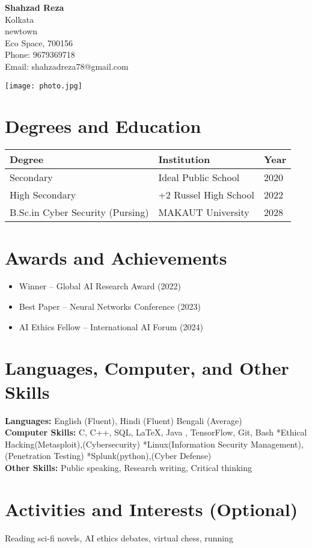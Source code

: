 \documentclass[12pt]{article}
\begin{document}
\begin{minipage}{0.7\textwidth}
    \Huge \textbf{Shahzad Reza} \\[6pt]
    \normalsize
    Kolkata \\
    newtown \\
    Eco Space, 700156 \\
    Phone: 9679369718 \\
    Email: shahzadreza78@gmail.com
\end{minipage}
\hfill
\begin{minipage}{0.25\textwidth}
 \texttt{[image: photo.jpg]}
\end{minipage}

\vspace{1em}

\section*{Degrees and Education}
\begin{tabularx}{\textwidth}{|X|X|X|}
\hline
\textbf{Degree} & \textbf{Institution} & \textbf{Year} \\
\hline
Secondary & Ideal Public School & 2020 \\
\hline
High Secondary & +2 Russel High School & 2022 \\
\hline
B.Sc.in Cyber Security (Pursing) & MAKAUT University & 2028 \\
\hline
\end{tabularx}

\section*{Awards and Achievements}
\begin{itemize}
    \item Winner – Global AI Research Award (2022)
    \item Best Paper – Neural Networks Conference (2023)
    \item AI Ethics Fellow – International AI Forum (2024)
\end{itemize}


\section*{Languages, Computer, and Other Skills}
\textbf{Languages:} English (Fluent), Hindi (Fluent) Bengali (Average) \\
\textbf{Computer Skills:} C, C++, SQL, LaTeX, Java , TensorFlow, Git, Bash 
*Ethical Hacking(Metasploit),(Cybersecurity)
*Linux(Information Security Management),(Penetration Testing)
*Splunk(python),(Cyber Defense)\\
\textbf{Other Skills:} Public speaking, Research writing, Critical thinking

\section*{Activities and Interests (Optional)}
Reading sci-fi novels, AI ethics debates, virtual chess, running
\end{document}
